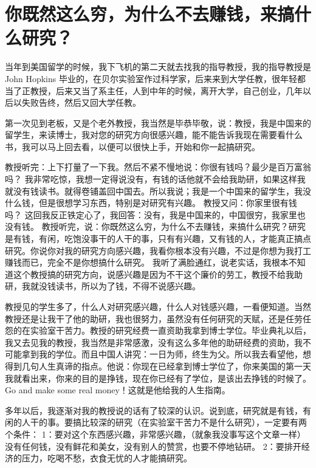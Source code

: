 \chapter{你既然这么穷，为什么不去赚钱，来搞什么研究？}

当年到美国留学的时候\cite{sopoor}，我下飞机的第二天就去找我的指导教授，我的指导教授是John Hopkins 毕业的，在贝尔实验室作过科学家，后来来到大学任教，很年轻都当了正教授，后来又当了系主任，人到中年的时候，离开大学，自己创业，几年以后以失败告终，然后又回大学任教。

第一次见到老板，又是个老外教授，我当然是毕恭毕敬，说：教授，我是中国来的留学生，来读博士，我对您的研究方向很感兴趣，能不能告诉我现在需要看什么书，我可以马上回去看，以便可以很快上手，开始和你一起搞研究。

教授听完：上下打量了一下我。然后不紧不慢地说：你很有钱吗？最少是百万富翁吗？
我非常吃惊，我想一定得说没有，有钱的话他就不会给我助研，如果这样我就没有钱读书。就得卷铺盖回中国去。所以我说；我是一个中国来的留学生，我没什么钱，但是很想学习东西，特别是对研究有兴趣。
教授又问：你家里很有钱吗？
这回我反正铁定心了，我回答：没有，我是中国来的，中国很穷，我家里也没有钱。
教授听完，说：你既然这么穷，为什么不去赚钱，来搞什么研究？研究是有钱，有闲，吃饱没事干的人干的事，只有有兴趣，又有钱的人，才能真正搞点研究。你说你对我的研究方向感兴趣，我看你根本没有兴趣，不过是你想为我打工赚钱而已，完全不是你想搞什么研究。
我听了满脸通红，说老实话，我根本不知道这个教授搞的研究方向，说感兴趣是因为不干这个廉价的劳工，教授不给我助研，我就没钱读书，所以为了钱，不得不说感兴趣。



教授见的学生多了，什么人对研究感兴趣，什么人对钱感兴趣，一看便知道。当然教授还是让我干了他的助研，我也很努力，虽然没有任何研究的天赋，还是任劳任怨的在实验室干苦力。教授的研究经费一直资助我拿到博士学位。毕业典礼以后，我又去见我的教授，我当然是非常感激，没有这么多年他的助研经费的资助，我不可能拿到我的学位。而且中国人讲究：一日为师，终生为父。所以我去看望他，想得到几句人生真谛的指点。他说：你现在已经拿到博士学位了，你来美国的第一天我就看出来，你来的目的是挣钱，现在你已经有了学位，是该出去挣钱的时候了。Go and make some real money！这就是他给我的人生指南。

多年以后，我逐渐对我的教授说的话有了较深的认识。说到底，研究就是有钱，有闲的人干的事。要搞比较深的研究（在实验室干苦力不是什么研究），一定要有两个条件：
1：要对这个东西感兴趣，非常感兴趣，（就象我没事写这个文章一样）没有任何钱，没有鲜花和美女，没有别人的赞赏，也要不停地钻研。
2：要排开经济的压力，吃喝不愁，衣食无忧的人才能搞研究。

